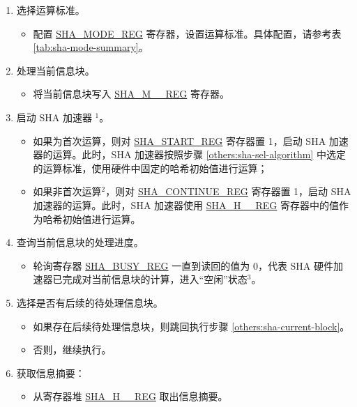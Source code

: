 \documentclass[main\_\_CN.tex]{subfiles}
\begin{document}
\begin{enumerate}
    \item \label{others:sha-sel-algorithm} 选择运算标准。
    \begin{itemize}
        \item 配置 \hyperref[regdesc:SHAMODEREG]{SHA\_MODE\_REG} 寄存器，设置运算标准。具体配置，请参考表 \ref{tab:sha-mode-summary}。
    \end{itemize}
    \item \label{others:sha-current-block} 处理当前信息块。
    \begin{itemize}
        \item 将当前信息块写入 \hyperref[regdesc:SHAMNREG]{SHA\_M\_\_REG} 寄存器。
    \end{itemize}
    \item 启动 SHA 加速器 \hyperref[others:sha-note-typical-sha]{$^1$}。
            \begin{itemize}
                \item 如果为首次运算，则对 \hyperref[regdesc:SHASTARTREG]{SHA\_START\_REG} 寄存器置 1，启动 SHA 加速器的运算。此时，SHA 加速器按照步骤 \ref{others:sha-sel-algorithm} 中选定的运算标准，使用硬件中固定的哈希初始值进行运算；
                \item 如果非首次运算\hyperref[others:sha-note-typical-sha]{$^2$}，则对 \hyperref[regdesc:SHACONTINUEREG]{SHA\_CONTINUE\_REG} 寄存器置 1，启动 SHA 加速器的运算。此时，SHA 加速器使用 \hyperref[regdesc:SHAHNREG]{SHA\_H\_\_REG} 寄存器中的值作为哈希初始值进行运算。
            \end{itemize}
    \item 查询当前信息块的处理进度。
    \begin{itemize}
        \item 轮询寄存器 \hyperref[regdesc:SHABUSYREG]{SHA\_BUSY\_REG} 一直到读回的值为 0，代表 SHA 硬件加速器已完成对当前信息块的计算，进入“空闲”状态\hyperref[others:sha-note-typical-sha]{$^3$}。
    \end{itemize}
        
    \item 选择是否有后续的待处理信息块。
    \begin{itemize}
        \item 如果存在后续待处理信息块，则跳回执行步骤 \ref{others:sha-current-block}。
        \item 否则，继续执行。
    \end{itemize}
    \item 获取信息摘要：
    \begin{itemize}
        \item 从寄存器堆 \hyperref[regdesc:SHAHNREG]{SHA\_H\_\_REG} 取出信息摘要。
    \end{itemize}
\end{enumerate}
\end{document}
